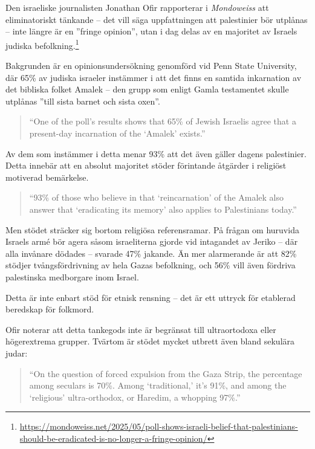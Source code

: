 Den israeliske journalisten Jonathan Ofir rapporterar i \textit{Mondoweiss} att eliminatoriskt tänkande – det vill säga uppfattningen att palestinier bör utplånas – inte längre är en ”fringe opinion”, utan i dag delas av en majoritet av Israels judiska befolkning.\footnote{\url{https://mondoweiss.net/2025/05/poll-shows-israeli-belief-that-palestinians-should-be-eradicated-is-no-longer-a-fringe-opinion/}}

Bakgrunden är en opinionsundersökning genomförd vid Penn State University, där 65\% av judiska israeler instämmer i att det finns en samtida inkarnation av det bibliska folket Amalek – den grupp som enligt Gamla testamentet skulle utplånas ”till sista barnet och sista oxen”. 

\begin{quote}
“One of the poll’s results shows that 65\% of Jewish Israelis agree that a present-day incarnation of the ‘Amalek’ exists.”
\end{quote}

Av dem som instämmer i detta menar 93\% att det även gäller dagens palestinier. Detta innebär att en absolut majoritet stöder förintande åtgärder i religiöst motiverad bemärkelse.

\begin{quote}
“93\% of those who believe in that ‘reincarnation’ of the Amalek also answer that ‘eradicating its memory’ also applies to Palestinians today.”
\end{quote}

Men stödet sträcker sig bortom religiösa referensramar. På frågan om huruvida Israels armé bör agera såsom israeliterna gjorde vid intagandet av Jeriko – där alla invånare dödades – svarade 47\% jakande. Än mer alarmerande är att 82\% stödjer tvångsfördrivning av hela Gazas befolkning, och 56\% vill även fördriva palestinska medborgare inom Israel.

Detta är inte enbart stöd för etnisk rensning – det är ett uttryck för etablerad beredskap för folkmord.

Ofir noterar att detta tankegods inte är begränsat till ultraortodoxa eller högerextrema grupper. Tvärtom är stödet mycket utbrett även bland sekulära judar:

\begin{quote}
“On the question of forced expulsion from the Gaza Strip, the percentage among seculars is 70\%. Among ‘traditional,’ it’s 91\%, and among the ‘religious’ ultra-orthodox, or Haredim, a whopping 97\%.”
\end{quote}

